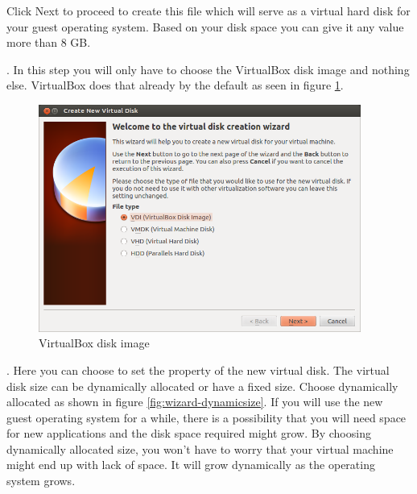 \par \noindent Click Next to proceed to create this file which will serve as a virtual hard disk for your guest operating system. Based on your disk space you can give it any value more than 8 GB.\\

\newpage
\par {}. In this step you will only have to choose the VirtualBox disk image and nothing else. VirtualBox does that already by the default as seen in figure \ref{fig:wizard-VDI}. \\

\begin{figure}[!h]	
	\centering
	\includegraphics[width=300pt]{./images/installation/virtualbox/wizard-VDI.png}
	\caption{VirtualBox disk image}	
	\label{fig:wizard-VDI}	
\end{figure}

\par {}. Here you can choose to set the property of the new virtual disk. The virtual disk size can be dynamically allocated  or have a fixed size. Choose dynamically allocated as shown in figure \ref{fig:wizard-dynamicsize}. If you will use the new guest operating system for a while, there is a possibility that you will need space for new applications and the disk space required might grow. By choosing dynamically allocated size, you won't have to worry that your virtual machine might end up with lack of space. It will grow dynamically as the operating system grows. \\

